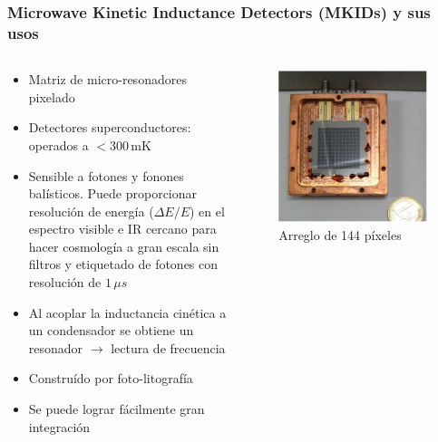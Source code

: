 \documentclass{beamer}
\begin{document}
\begin{frame}
				\frametitle{Microwave Kinetic Inductance Detectors (MKIDs) y sus usos}
				\begin{columns}
								\begin{column}{0.75\textwidth}
								\begin{block}{}
								\begin{itemize}
								\item Matriz de micro-resonadores pixelado
								\item Detectores superconductores: operados a $<
												300\,\text{mK}$
								\item Sensible a fotones y fonones
												balísticos. Puede proporcionar
												resolución de energía ($
												\Delta E/E$)
												en el espectro visible e
												IR cercano para hacer
												cosmología a gran escala sin
												filtros y etiquetado de fotones
												con resolución de $1\,\mu s$
								\item Al acoplar la inductancia cinética a un
												condensador se obtiene un resonador $\to$ lectura de frecuencia
								\item Construído por foto-litografía
								\item Se puede lograr fácilmente gran integración
				\end{itemize}
\end{block}
\end{column} \ \
				\begin{column}{0.25\textwidth}
				\includegraphics[width=0.8\textwidth]{arreglo_mkid_144px}
				Arreglo de 144 píxeles
\end{column}
\end{columns}
\end{frame}
\end{document}
